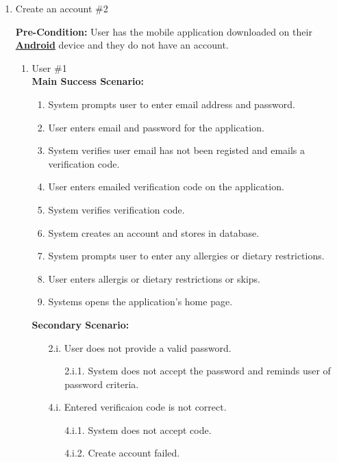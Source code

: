 \documentclass[]{article}
\begin{document}
\begin{enumerate}[{\bf BE1.}]
	\item Create an account \#2
	
	\textbf{Pre-Condition:} User has the mobile application downloaded on their \hyperref[Android]{\textbf{Android}} device and they do not have an account.
		\begin{enumerate}[{\bf VP1.}]
			\item User \#1 \\
				\textbf{Main Success Scenario:} 
				\begin{enumerate}[{1.}]
					\item System prompts user to enter email address and password.
					\item User enters email and password for the application.
					\item System verifies user email has not been registed and emails a verification code.
					\item User enters emailed verification code on the application.
					\item System verifies verification code.
					\item System creates an account and stores in database.
					\item System prompts user to enter any allergies or dietary restrictions.
					\item User enters allergis or dietary restrictions or skips.
					\item Systems opens the application's home page.
				\end{enumerate}
				\textbf{Secondary Scenario:}
				\begin{enumerate}
					\item[2.i.] User does not provide a valid password.
					\begin{enumerate}
						\item[2.i.1.] System does not accept the password and reminds user of password criteria.
					\end{enumerate}
				\end{enumerate}
				\begin{enumerate}
					\item[4.i.] Entered verificaion code is not correct.
					\begin{enumerate}
						\item[4.i.1.] System does not accept code.
						\item[4.i.2.] Create account failed.
					\end{enumerate}
				\end{enumerate}


\end{enumerate}
\end{enumerate}
\end{document}
